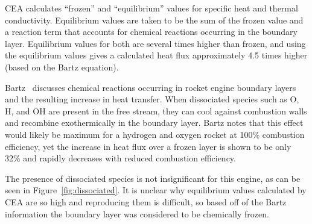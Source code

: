 \documentclass[11pt]{article}
\begin{document}
CEA calculates ``frozen'' and ``equilibrium'' values for specific heat and thermal conductivity. Equilibrium values are taken to be the sum of the frozen value and a reaction term that accounts for chemical reactions occurring in the boundary layer. Equilibrium values for both are several times higher than frozen, and using the equilibrium values gives a calculated heat flux approximately 4.5 times higher (based on the Bartz equation).

Bartz~\cite[Page 46]{bartz_turbulent_1965} discusses chemical reactions occurring in rocket engine boundary layers and the resulting increase in heat transfer. When dissociated species such as O, H, and OH are present in the free stream, they can cool against combustion walls and recombine exothermically in the boundary layer. Bartz notes that this effect would likely be maximum for a hydrogen and oxygen rocket at 100\% combustion efficiency, yet the increase in heat flux over a frozen layer is shown to be only 32\% and rapidly decreases with reduced combustion efficiency.

The presence of dissociated species is not insignificant for this engine, as can be seen in Figure~\ref{fig:dissociated}. It is unclear why equilibrium values calculated by CEA are so high and reproducing them is difficult, so based off of the Bartz information the boundary layer was considered to be chemically frozen.
\end{document}
